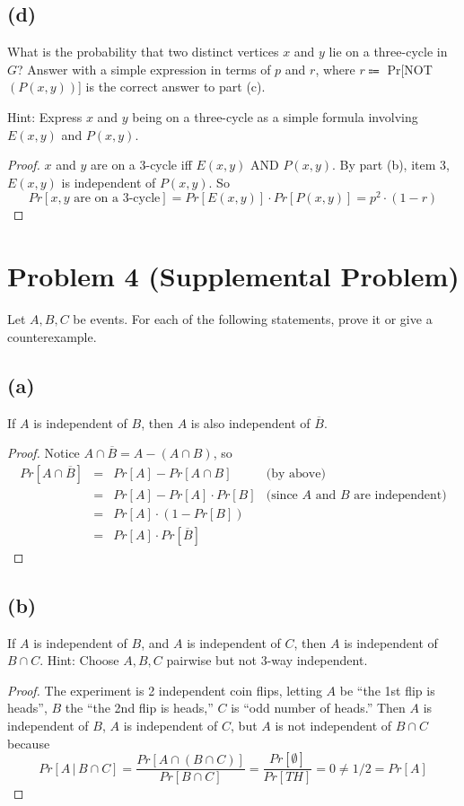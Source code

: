 \documentclass[14pt]{extarticle}
\begin{document}
\subsection{(d)}
What is the probability that two distinct vertices $x$ and $y$ lie on a three-cycle in $G$? Answer with a simple expression in terms of $p$ and $r$, where $r \Coloneqq$ Pr[NOT$(P(x, y))$] is the correct answer to part (c).

Hint: Express $x$ and $y$ being on a three-cycle as a simple formula involving $E(x, y)$ and $P(x, y)$.

\begin{proof}
$x$ and $y$ are on a 3-cycle iff $E(x,y)$ AND $P(x,y)$. By part (b), item 3, $E(x,y)$ is independent of $P(x,y)$. So
$$
Pr[x, y \text{ are on a 3-cycle}] = Pr[E(x,y)] \cdot Pr[P(x,y)] = p^2 \cdot (1-r)
$$
\end{proof}

\section{Problem 4 (Supplemental Problem)}
Let $A, B, C$ be events. For each of the following statements, prove it or give a counterexample.

\subsection{(a)}
If $A$ is independent of $B$, then $A$ is also independent of $\overline{B}$.

\begin{proof}
Notice $A \cap \overline{B} = A - (A \cap B)$, so
$$
\begin{array}{rclr}
Pr[A \cap \overline{B}]&=&Pr[A] - Pr[A\cap B]&\text{(by above)}\\
&=&Pr[A] - Pr[A]\cdot Pr[B]&\text{(since $A$ and $B$ are independent)}\\
&=&Pr[A]\cdot (1- Pr[B])&\\
&=&Pr[A] \cdot Pr[\overline{B}]&
\end{array}
$$
\end{proof}

\subsection{(b)}
If $A$ is independent of $B$, and $A$ is independent of $C$, then $A$ is independent of $B \cap C$. Hint: Choose $A, B, C$ pairwise but not 3-way independent.

\begin{proof}
The experiment is 2 independent coin flips, letting $A$ be “the 1st flip is heads”, $B$ the “the 2nd flip is heads,” $C$ is “odd number of heads.” Then $A$ is independent of $B$, $A$ is independent of $C$, but $A$ is not independent of $B \cap C$ because
$$
Pr[A \,|\, B \cap C] = \frac{Pr[A \cap (B \cap C)]}{Pr[B \cap C]} = \frac{Pr[\emptyset]}{Pr[TH]} = 0 \neq 1/2 = Pr[A]
$$
\end{proof}
\end{document}
